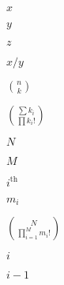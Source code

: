 \documentclass{article}
\begin{document}
$x$
\pagebreak

$y$
\pagebreak

$z$
\pagebreak

$x/y$
\pagebreak

${n\choose k}$
\pagebreak

${{\sum k_i} \choose {\prod k_i!}}$
\pagebreak

$N$
\pagebreak

$M$
\pagebreak

$i^\text{th}$
\pagebreak

$m_i$
\pagebreak

${ N \choose {\prod_{i=1}^M m_i!}}$
\pagebreak

$i$
\pagebreak

$i-1$
\pagebreak
\end{document}
